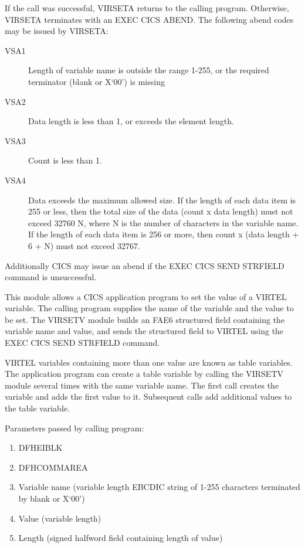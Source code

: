 \documentclass[letterpaper,10pt,english]{sphinxmanual}
\begin{document}
If the call was successful, VIRSETA returns to the calling program. Otherwise, VIRSETA terminates with an EXEC CICS ABEND.
The following abend codes may be issued by VIRSETA:
\begin{description}
\item[{VSA1}] \leavevmode
Length of variable name is outside the range 1-255, or the required terminator (blank or X‘00’) is missing

\item[{VSA2}] \leavevmode
Data length is less than 1, or exceeds the element length.

\item[{VSA3}] \leavevmode
Count is less than 1.

\item[{VSA4}] \leavevmode
Data exceeds the maximum allowed size. If the length of each data item is 255 or less, then the total size of the data (count x data length) must not exceed 32760 \textendash{} N, where N is the number of characters in the variable name. If the length of each data item is 256 or more, then count x (data length + 6 + N) must not exceed 32767.

\end{description}

Additionally CICS may issue an abend if the EXEC CICS SEND STRFIELD command is unsuccessful.


This module allows a CICS application program to set the value of a VIRTEL variable. The calling program supplies the
name of the variable and the value to be set. The VIRSETV module builds an FAE6 structured field containing the
variable name and value, and sends the structured field to VIRTEL using the EXEC CICS SEND STRFIELD command.

VIRTEL variables containing more than one value are known as table variables. The application program can create a
table variable by calling the VIRSETV module several times with the same variable name. The first call creates the
variable and adds the first value to it. Subsequent calls add additional values to the table variable.


Parameters passed by calling program:
\begin{enumerate}
\item {} 
DFHEIBLK

\item {} 
DFHCOMMAREA

\item {} 
Variable name (variable length EBCDIC string of 1-255 characters terminated by blank or X‘00’)

\item {} 
Value (variable length)

\item {} 
Length (signed halfword field containing length of value)

\end{enumerate}
\end{document}
